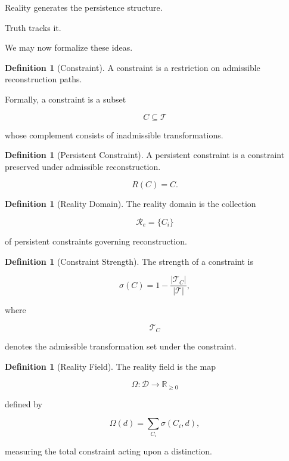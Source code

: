 \documentclass[12pt,oneside]{article}
\theoremstyle{definition}
\newtheorem{definition}[theorem]{Definition} \newtheorem{axiom}[theorem]{Axiom} \newtheorem{remark}[theorem]{Remark} \newtheorem{example}[theorem]{Example}
\begin{document}
Reality generates the persistence structure.

Truth tracks it.

We may now formalize these ideas.

\begin{definition}[Constraint]

A constraint is a restriction on admissible reconstruction paths.

Formally, a constraint is a subset

\[
C
\subseteq
\mathcal T
\]

whose complement consists of inadmissible transformations.

\end{definition}

\begin{definition}[Persistent Constraint]

A persistent constraint is a constraint preserved under admissible reconstruction.

\[
R(C)=C.
\]

\end{definition}

\begin{definition}[Reality Domain]

The reality domain is the collection

\[
\mathcal R_e
=
\{C_i\}
\]

of persistent constraints governing reconstruction.

\end{definition}

\begin{definition}[Constraint Strength]

The strength of a constraint is

\[
\sigma(C)
=
1
-
\frac{
|\mathcal T_C|
}{
|\mathcal T|
},
\]

where

\[
\mathcal T_C
\]

denotes the admissible transformation set under the constraint.

\end{definition}

\begin{definition}[Reality Field]

The reality field is the map

\[
\Omega :
\mathcal D
\rightarrow
\mathbb R_{\ge 0}
\]

defined by

\[
\Omega(d)
=
\sum_{C_i}
\sigma(C_i,d),
\]

measuring the total constraint acting upon a distinction.

\end{definition}
\end{document}
